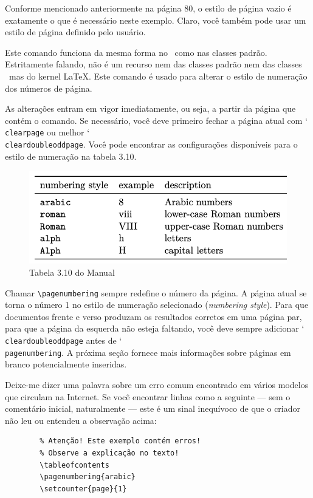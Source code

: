Conforme mencionado anteriormente na página 80, o estilo de página vazio é exatamente o que é necessário neste exemplo. Claro, você também pode usar um estilo de página definido pelo usuário.


Este comando funciona da mesma forma no \KOMAScript\ como nas classes padrão. Estritamente falando, não é um recurso nem das classes padrão nem das classes \KOMAScript\ mas do kernel \LaTeX. Este comando é usado para alterar o estilo de numeração dos números de página.

As alterações entram em vigor imediatamente, ou seja, a partir da página que contém o comando. Se necessário, você deve primeiro fechar a página atual com \char`\\\texttt{clear\-page} ou melhor \char`\\\texttt{clear\-dou\-ble\-odd\-page}. Você pode encontrar as configurações disponíveis para o estilo de numeração na tabela 3.10.

\begin{figure}[hb]
    \centering
    \includegraphics[width=0.7\linewidth]{tab3_10.png}
    \caption{Tabela 3.10 do Manual}
    \label{fig:tab3_10}
\end{figure}

Chamar \verb|\pagenumbering| sempre redefine o número da página. A página atual se torna o número 1 no estilo de numeração selecionado (\textit{numbering style}). Para que documentos frente e verso produzam os resultados corretos em uma página par, para que a página da esquerda não esteja faltando, você deve sempre adicionar \char`\\\texttt{clear\-dou\-ble\-odd\-pa\-ge} antes de \char`\\\texttt{pa\-ge\-num\-be\-ring}. A próxima seção fornece mais informações sobre páginas em branco potencialmente inseridas.

Deixe-me dizer uma palavra sobre um erro comum encontrado em vários modelos que circulam na Internet. Se você encontrar linhas como a seguinte — sem o comentário inicial, naturalmente — este é um sinal inequívoco de que o criador não leu ou entendeu a observação acima:
\begin{verbatim}
        % Atenção! Este exemplo contém erros!
        % Observe a explicação no texto!
        \tableofcontents
        \pagenumbering{arabic}
        \setcounter{page}{1}
\end{verbatim}

